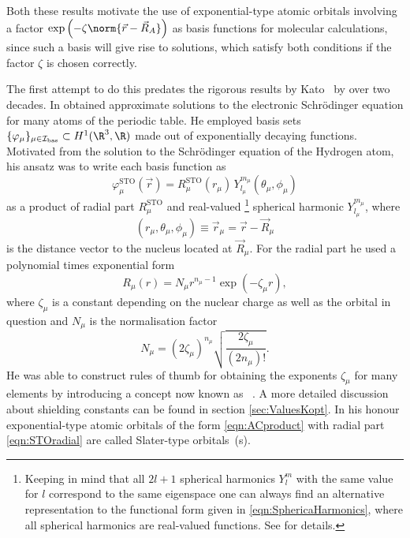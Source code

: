 Both these results motivate the use of exponential-type atomic orbitals
involving a factor $\exp\left(-\zeta \norm{\vec{r} - \vec{R}_A} \right)$
as basis functions for molecular calculations,
since such a basis will give rise to solutions,
which satisfy both conditions if the factor $\zeta$ is chosen correctly.

The first attempt to do this predates the rigorous results by Kato~\cite{Kato1951,Kato1957}
by over two decades.
In \citeyear{Slater1930} \citet{Slater1930}
obtained approximate solutions to the electronic Schrödinger equation
for many atoms of the periodic table.
He employed basis sets $\{\varphi_\mu\}_{\mu\in\Ibas} \subset H^1(\R^3,\R)$
made out of exponentially decaying functions.
Motivated from the solution to the Schrödinger equation of the Hydrogen atom,
his ansatz was to write each basis function as
\begin{equation}
	\varphi^\text{STO}_\mu(\vec{r})
	= R^\text{STO}_\mu(r_\mu) \, Y_{l_\mu}^{m_\mu}(\theta_\mu, \phi_\mu)
	\label{eqn:ACproduct}
\end{equation}
\ie as a product of radial part $R^\text{STO}_\mu$
and real-valued%
\footnote{Keeping in mind that all $2l+1$ spherical harmonics
	$Y_l^m$ with the same value for $l$ correspond to the same eigenspace
	one can always find an alternative representation to the functional
	form given in \eqref{eqn:SphericaHarmonics},
	where all spherical harmonics are real-valued functions.
	See \cite{Avery2018} for details.
} spherical harmonic $Y_{l_\mu}^{m_\mu}$, where
\[ \left(r_\mu, \theta_\mu, \phi_\mu\right) \equiv \vec{r}_\mu = \vec{r} - \vec{R}_\mu \]
is the distance vector to the nucleus located at $\vec{R}_\mu$.
For the radial part he used a polynomial times exponential form
\begin{equation}
	R_\mu(r) = N_\mu r^{n_{\mu}-1} \exp(-\zeta_\mu r),
	\label{eqn:STOradial}
\end{equation}
where $\zeta_\mu$
is a constant depending on the nuclear charge as well as
the orbital in question and
$N_\mu$ is the normalisation factor
\[ N_\mu = \left( 2\zeta_\mu \right)^{n_\mu} \sqrt{\frac{2\zeta_\mu}{(2n_\mu)!}}. \]
He was able to construct rules of thumb for obtaining the exponents $\zeta_\mu$
for many elements by introducing
a concept now known as ~\cite{Slater1930}.
A more detailed discussion about shielding constants
can be found in section \vref{sec:ValuesKopt}.
In his honour exponential-type atomic orbitals of the form \eqref{eqn:ACproduct}
with radial part \eqref{eqn:STOradial}
are called Slater-type orbitals~({\STO}s).

